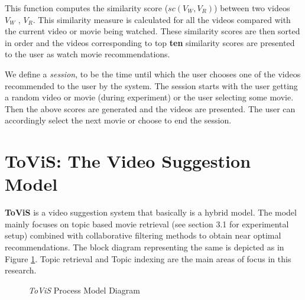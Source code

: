 This function computes the similarity score ($sc(V_W, V_R)$) between two videos $V_W$ , $V_R$. This similarity measure is calculated for all the videos compared with the current video or movie being watched. These similarity scores are then sorted in order and the videos corresponding to top \textbf{ten} similarity scores are presented to the user as watch movie recommendations. \par 
We define a \textit{session}, to be the time until which the user chooses one of the videos recommended to the user by the system. The session starts with the user getting a random video or movie (during experiment) or the user selecting some movie. Then the above scores are generated and the videos are presented. The user can accordingly select the next movie or choose to end the session. 

\section{ToViS: The Video Suggestion Model}

\textbf{ToViS} is a video suggestion system that basically is a hybrid model. The model mainly focuses on topic based movie retrieval (see section 3.1 for experimental setup) combined with collaborative filtering methods to obtain near optimal recommendations. The block diagram representing the same is depicted as in Figure \ref{block}. Topic retrieval and Topic indexing are the main areas of focus in this research.

\begin{figure}
\caption{\textit{ToViS} Process Model Diagram}
\label{block}
\end{figure}
